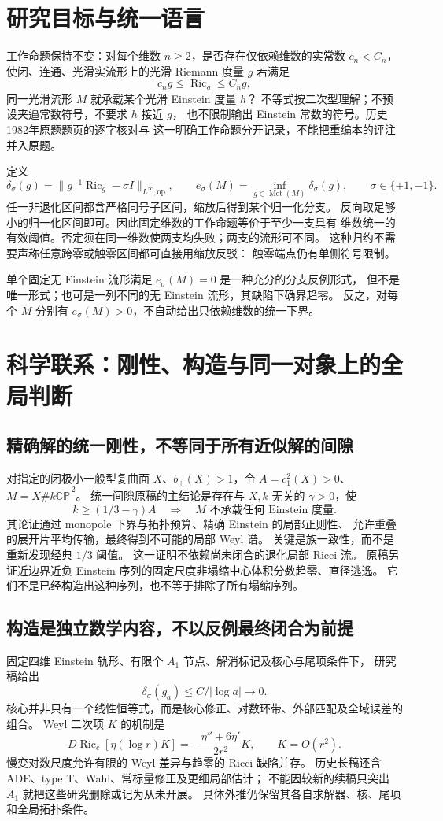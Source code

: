 \documentclass[UTF8,fontset=fandol,zihao=-4]{ctexart}
\newcommand{\Ric}{\operatorname{Ric}}
\begin{document}
\section{研究目标与统一语言}
工作命题保持不变：对每个维数 $n\ge2$，是否存在仅依赖维数的实常数
$c_n<C_n$，使闭、连通、光滑实流形上的光滑 Riemann 度量 $g$ 若满足
\[
 c_ng\le\Ric_g\le C_ng,
\]
同一光滑流形 $M$ 就承载某个光滑 Einstein 度量 $h$？
不等式按二次型理解；不预设夹逼常数符号，不要求 $h$ 接近 $g$，
也不限制输出 Einstein 常数的符号。历史1982年原题题页的逐字核对与
这一明确工作命题分开记录，不能把重编本的评注并入原题。

定义
\[
 \delta_\sigma(g)=\|g^{-1}\Ric_g-\sigma I\|_{L^\infty,\mathrm{op}},
 \qquad e_\sigma(M)=\inf_{g\in\operatorname{Met}(M)}\delta_\sigma(g),
 \qquad \sigma\in\{+1,-1\}.
\]
任一非退化区间都含严格同号子区间，缩放后得到某个归一化分支。
反向取足够小的归一化区间即可。因此固定维数的工作命题等价于至少一支具有
维数统一的有效阈值。否定须在同一维数使两支均失败；两支的流形可不同。
这种归约不需要声称任意跨零或触零区间都可直接用缩放反驳：
触零端点仍有单侧符号限制。

单个固定无 Einstein 流形满足 $e_\sigma(M)=0$ 是一种充分的分支反例形式，
但不是唯一形式；也可是一列不同的无 Einstein 流形，其缺陷下确界趋零。
反之，对每个 $M$ 分别有 $e_\sigma(M)>0$，不自动给出只依赖维数的统一下界。

\section{科学联系：刚性、构造与同一对象上的全局判断}
\subsection{精确解的统一刚性，不等同于所有近似解的间隙}
对指定的闭极小一般型复曲面 $X$、$b_+(X)>1$，令
$A=c_1^2(X)>0$、$M=X\#k\overline{\mathbb{CP}}^{\,2}$。
统一间隙原稿的主结论是存在与 $X,k$ 无关的 $\gamma>0$，使
\[
 k\ge(1/3-\gamma)A\quad\Longrightarrow\quad
 M\text{ 不承载任何 Einstein 度量}.
\]
其论证通过 monopole 下界与拓扑预算、精确 Einstein 的局部正则性、
允许重叠的展开片平均传输，最终得到不可能的局部 Weyl 谱。
关键是族一致性，而不是重新发现经典 $1/3$ 阈值。
这一证明不依赖尚未闭合的退化局部 Ricci 流。
原稿另证近边界近负 Einstein 序列的固定尺度非塌缩中心体积分数趋零、直径逃逸。
它们不是已经构造出这种序列，也不等于排除了所有塌缩序列。

\subsection{构造是独立数学内容，不以反例最终闭合为前提}
固定四维 Einstein 轨形、有限个 $A_1$ 节点、解消标记及核心与尾项条件下，
研究稿给出
\[
 \delta_\sigma(g_a)\le C/|\log a|\longrightarrow0.
\]
核心并非只有一个线性恒等式，而是核心修正、对数环带、外部匹配及全域误差的组合。
Weyl 二次项 $K$ 的机制是
\[
 D\Ric_e[\eta(\log r)K]
 =-\frac{\eta''+6\eta'}{2r^2}K,
 \qquad K=O(r^2).
\]
慢变对数尺度允许有限的 Weyl 差异与趋零的 Ricci 缺陷并存。
历史长稿还含 ADE、type T、Wahl、常标量修正及更细局部估计；
不能因较新的续稿只突出 $A_1$ 就把这些研究删除或记为从未开展。
具体外推仍保留其各自求解器、核、尾项和全局拓扑条件。
\end{document}
